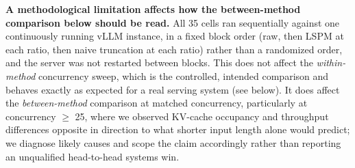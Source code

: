 \textbf{A methodological limitation affects how the between-method comparison below should be read.} All 35 cells ran sequentially against one continuously running vLLM instance, in a fixed block order (raw, then LSPM at each ratio, then naive truncation at each ratio) rather than a randomized order, and the server was not restarted between blocks. This does not affect the \textit{within-method} concurrency sweep, which is the controlled, intended comparison and behaves exactly as expected for a real serving system (see below). It does affect the \textit{between-method} comparison at matched concurrency, particularly at concurrency $\geq$ 25, where we observed KV-cache occupancy and throughput differences opposite in direction to what shorter input length alone would predict; we diagnose likely causes and scope the claim accordingly rather than reporting an unqualified head-to-head systems win.

